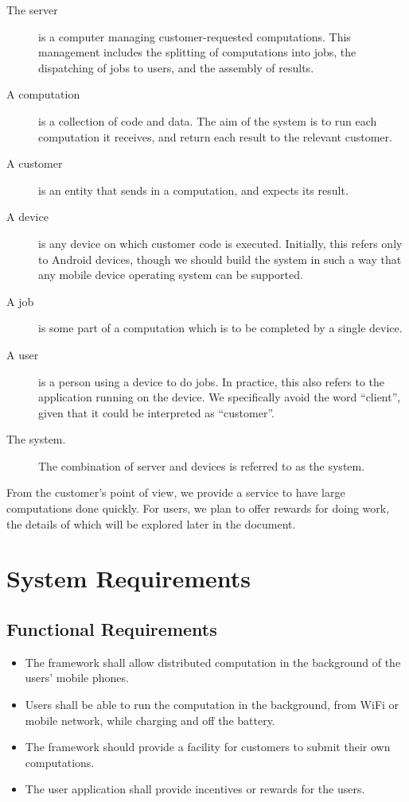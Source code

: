 \documentclass[a4paper,10pt]{article}
\begin{document}
\begin{description}
      \item [The server] is a computer managing customer-requested computations. This management includes the splitting of computations into jobs, the dispatching of jobs to users, and the assembly of results.
      \item [A computation] is a collection of code and data. The aim of the system is to run each computation it receives, and return each result to the relevant customer.
      \item [A customer] is an entity that sends in a computation, and expects its result.
      \item [A device] is any device on which customer code is executed. Initially, this refers only to Android devices, though we should build the system in such a way that any mobile device operating system can be supported.
      \item [A job] is some part of a computation which is to be completed by a single device.
      \item [A user] is a person using a device to do jobs. In practice, this also refers to the application running on the device. We specifically avoid the word “client”, given that it could be interpreted as “customer”.
      \item [The system.] The combination of server and devices is referred to as the system.
\end{description}
From the customer’s point of view, we provide a service to have large computations done quickly. For users, we plan to offer rewards for doing work, the details of which will be explored later in the document.



\section{System Requirements}


\subsection{Functional Requirements}

\begin{itemize}
	\item The framework shall allow distributed computation in the background of the users’ mobile phones.
	\item Users shall be able to run the computation in the background, from WiFi or mobile network, while charging and off the battery.
	\item The framework should provide a facility for customers to submit their own computations.
	\item The user application shall provide incentives or rewards for the users.
\end{itemize} 
\end{document}
